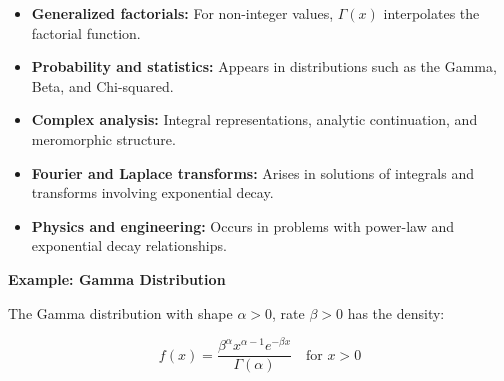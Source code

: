 \begin{itemize}

    \item \textbf{Generalized factorials:} For non-integer values, \( \Gamma(x) \) interpolates the factorial function.

    \item \textbf{Probability and statistics:} Appears in distributions such as the Gamma, Beta, and Chi-squared.

    \item \textbf{Complex analysis:} Integral representations, analytic continuation, and meromorphic structure.

    \item \textbf{Fourier and Laplace transforms:} Arises in solutions of integrals and transforms involving exponential decay.

    \item \textbf{Physics and engineering:} Occurs in problems with power-law and exponential decay relationships.

\end{itemize}

\textbf{Example: Gamma Distribution}
\vspace{\baselineskip}

The Gamma distribution with shape \( \alpha > 0 \), rate \( \beta > 0 \) has the density:

\[
    f(x) = \frac{\beta^\alpha x^{\alpha - 1} e^{-\beta x}}{\Gamma(\alpha)} \quad \text{for } x > 0
\]
